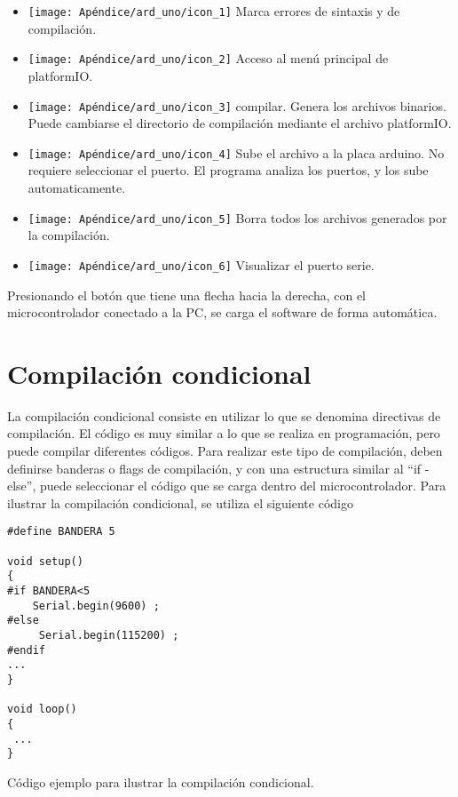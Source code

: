 \begin{itemize}  
    \item[]\hspace{-20mm}\texttt{[image: Apéndice/ard\_uno/icon\_1]} Marca errores de sintaxis y de compilación. 	
    \item[] \hspace{-10mm} \texttt{[image: Apéndice/ard\_uno/icon\_2]} Acceso al menú principal de platformIO. 
	\item[] \hspace{-10mm} \texttt{[image: Apéndice/ard\_uno/icon\_3]} compilar. Genera los archivos binarios. Puede cambiarse el directorio de compilación mediante el archivo platformIO.    
	\item[] \hspace{-10mm} \texttt{[image: Apéndice/ard\_uno/icon\_4]} Sube el archivo a la placa arduino. No requiere seleccionar el puerto. El programa analiza los puertos, y los sube automaticamente. 	
	\item[] \hspace{-10mm} \texttt{[image: Apéndice/ard\_uno/icon\_5]} Borra todos los archivos generados por la compilación. 
	\item[] \hspace{-10mm} \texttt{[image: Apéndice/ard\_uno/icon\_6]} Visualizar el puerto serie. 
\end{itemize}
 
Presionando el botón que tiene una flecha hacia la derecha, con el microcontrolador conectado a la PC, se carga el software de forma automática. 




\section{Compilación condicional}

La compilación condicional consiste en utilizar lo que se denomina directivas de compilación. El código es muy similar a lo que se realiza en programación, pero puede compilar diferentes códigos. Para realizar este tipo de compilación, deben definirse banderas o flags de compilación, y con una estructura similar al ``if - else'', puede seleccionar el código que se carga dentro del microcontrolador. Para ilustrar la compilación condicional, se utiliza el siguiente código 
\begin{listing}[ht!]
	\begin{verbatim}
#define BANDERA 5 

void setup()
{
#if BANDERA<5
	Serial.begin(9600) ; 
#else
	 Serial.begin(115200) ; 		
#endif
... 
}

void loop()
{
 ... 
}
	\end{verbatim}
\caption{Código ejemplo para ilustrar la compilación condicional.}
\label{cod:ejemplo_comp_cond}
\end{listing}
 
